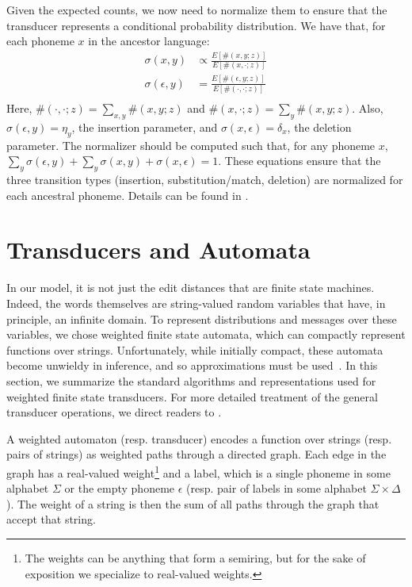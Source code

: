 \documentclass[11pt,a4paper]{article}
\begin{document}
Given the expected counts, we now need to normalize them to ensure
that the transducer represents a conditional probability distribution.
We have that, for each phoneme $x$ in the ancestor language:
\begin{equation*}
  \begin{split}
    \sigma(x,y) &\propto \frac{E[\#(x,y;z)]}{E[\#(x,\cdot;z)]} \\
    \sigma(\epsilon,y) &= \frac{E[\#(\epsilon,y;z)]}{E[\#(\cdot,\cdot;z)]} \\
   \end{split}
 \end{equation*}
Here, $\#(\cdot,\cdot;z) = \sum_{x,y} \#(x,y;z)$ and $\#(x,\cdot;z)=\sum_y
\#(x,y;z)$. Also, $\sigma(\epsilon,y) = \eta_y$, the insertion
parameter, and $\sigma(x,\epsilon) = \delta_x$, the deletion
parameter. The normalizer should be computed such that, for any
phoneme $x$, $\sum_y \sigma(\epsilon,y) + \sum_y \sigma(x,y) +
\sigma(x,\epsilon) = 1$.  These equations ensure that the three
transition types (insertion, substitution/match, deletion) are
normalized for each ancestral phoneme. Details can be found in
.

\section{Transducers and Automata}

In our model, it is not just the edit distances that are finite
state machines. Indeed, the words themselves are string-valued
random variables that have, in principle, an infinite domain. To
represent distributions and messages over these variables, we chose
weighted finite state automata, which can compactly represent
functions over strings. Unfortunately, while initially compact,
these automata become unwieldy in inference, and so approximations
must be used~\cite{dreyer2009graphical}.  In this section, we
summarize the standard algorithms and representations used for
weighted finite state transducers. For more detailed treatment of
the general transducer operations, we direct readers to
.

A weighted automaton (resp. transducer) encodes a function over
strings (resp. pairs of strings) as weighted paths through a directed
graph. Each edge in the graph has a real-valued weight\footnote{The
weights can be anything that form a semiring, but for the sake of
exposition we specialize to real-valued weights.} and a label, which
is a single phoneme in some alphabet $\Sigma$ or the empty phoneme
$\epsilon$ (resp. pair of labels in some alphabet $\Sigma \times
\Delta$). The weight of a string is then the sum of all paths through
the graph that accept that string.
\end{document}
